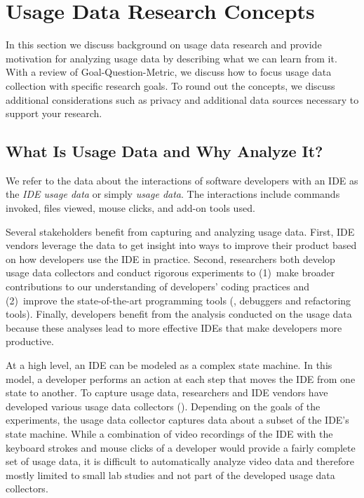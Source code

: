 \section{Usage Data Research Concepts}

In this section we discuss background on usage data research and provide motivation for analyzing usage data by describing what we can learn from it.  With a review of Goal-Question-Metric, we discuss how to focus usage data collection with specific research goals.  To round out the concepts, we discuss additional considerations such as privacy and additional data sources necessary to support your research.

\subsection{What Is Usage Data and Why Analyze It?}

We refer to the data about the interactions of software developers with an IDE as the
\emph{IDE usage data} or simply \emph{usage data}.  The interactions include commands invoked, files viewed, mouse clicks, and add-on tools used.

%
Several stakeholders benefit from capturing and analyzing usage data. First, IDE
vendors leverage the data to get insight into ways to improve their product
based on how developers use the IDE in practice. Second, researchers both
develop usage data collectors and conduct rigorous experiments to (1)~make
broader contributions to our understanding of developers' coding practices and
(2)~improve the state-of-the-art programming tools (\eg, debuggers and
refactoring tools). Finally, developers benefit from the analysis conducted on
the usage data because these analyses lead to more effective IDEs that make
developers more productive.

At a high level, an IDE can be modeled as a complex state machine. In this
model, a developer performs an action at each step that moves the IDE from one state
to another.
To capture usage data, researchers and IDE vendors have
developed various usage data collectors ().
Depending on the goals of the experiments, the usage data collector captures
data about a subset of the IDE's state machine. While a combination of video recordings of the IDE with the keyboard strokes and mouse clicks of a developer would provide a fairly complete set of usage data, it is difficult to automatically analyze video data and therefore mostly limited to small lab studies and not part of the developed usage data collectors.



